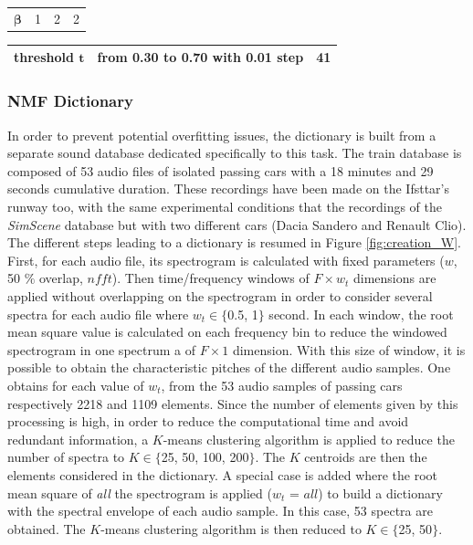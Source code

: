 \documentclass[twocolumn]{svjour3}          %
\begin{document}
\begin{table}[t]
\begin{tabularx}{17.5cm}{L{3cm}@{}C{6cm}@{}@{}C{6cm}@{}C{2cm}@{}}
   $\mathbf{\beta}$ & 1 & 2 & 2\\
\end{tabularx}

\begin{tabularx}{17.5cm}{L{3cm}@{}C{12cm}@{}C{2cm}@{}}
   threshold $\mathbf{t}$  &  from 0.30 to 0.70 with 0.01 step & 41\\
   \bottomrule
\end{tabularx}

\label{tab:experimental_factorsNMF}
\end{table}


\subsubsection{NMF Dictionary}\label{part:dictionary_learning}

In order to prevent potential overfitting issues, the dictionary is built from a separate sound database dedicated specifically to this task. The train database is composed of 53 audio files of isolated passing cars with a 18 minutes and 29 seconds cumulative duration. These recordings have been made on the Ifsttar's runway too, with the same experimental conditions that the recordings of the \textit{SimScene} database but with two different cars (Dacia Sandero and Renault Clio). The different steps leading to a dictionary is resumed in Figure \ref{fig:creation_W}. First, for each audio file, its spectrogram is calculated with fixed parameters ($w$, 50 $\%$ overlap, $nfft$). Then time/frequency windows of $F \times w_t $ dimensions are applied without overlapping on the spectrogram in order to consider several spectra for each audio file where $w_t \in \lbrace$0.5, 1$\rbrace$ second. In each window, the root mean square value is calculated on each frequency bin to reduce the windowed spectrogram in one spectrum a of $F \times 1$ dimension. With this size of window, it is possible to obtain the characteristic pitches of the different audio samples. One obtains for each value of $w_t$, from the 53 audio samples of passing cars respectively 2218 and 1109 elements. Since the number of elements given by this processing is high, in order to reduce the computational time and avoid redundant information, a $K$-means clustering algorithm is applied to reduce the number of spectra to $K \in \lbrace$25, 50, 100, 200$\rbrace$. The $K$ centroids are then the elements considered in the dictionary. A special case is added where the root mean square of \textit{all} the spectrogram is applied ($w_t$ = $all$) to build a dictionary with the spectral envelope of each audio sample. In this case, 53 spectra are obtained. The $K$-means clustering algorithm is then reduced to $K \in \lbrace$25, 50$\rbrace$.
\end{document}
